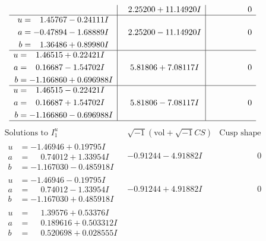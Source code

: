 \documentclass[1p]{elsarticle_modified}
\theoremstyle{definition}
\newcommand{\I}{\sqrt{-1}}
\begin{document}
$$\begin{array}{c|c|c}
 & \phantom{-}2.25200 + 11.14920 I & \phantom{-0.000000 } 0 \\ \hline\begin{aligned}
u &= \phantom{-}1.45767 - 0.24111 I \\
a &= -0.47894 - 1.68889 I \\
b &= \phantom{-}1.36486 + 0.89980 I\end{aligned}
 & \phantom{-}2.25200 - 11.14920 I & \phantom{-0.000000 } 0 \\ \hline\begin{aligned}
u &= \phantom{-}1.46515 + 0.22421 I \\
a &= \phantom{-}0.16687 - 1.54702 I \\
b &= -1.166860 + 0.696988 I\end{aligned}
 & \phantom{-}5.81806 + 7.08117 I & \phantom{-0.000000 } 0 \\ \hline\begin{aligned}
u &= \phantom{-}1.46515 - 0.22421 I \\
a &= \phantom{-}0.16687 + 1.54702 I \\
b &= -1.166860 - 0.696988 I\end{aligned}
 & \phantom{-}5.81806 - 7.08117 I & \phantom{-0.000000 } 0\\
 \hline 
 \end{array}$$\newpage$$\begin{array}{c|c|c}  
\text{Solutions to }I^u_{1}& \I (\text{vol} + \sqrt{-1}CS) & \text{Cusp shape}\\
 \hline 
\begin{aligned}
u &= -1.46946 + 0.19795 I \\
a &= \phantom{-}0.74012 + 1.33954 I \\
b &= -1.167030 - 0.485918 I\end{aligned}
 & -0.91244 - 4.91882 I & \phantom{-0.000000 } 0 \\ \hline\begin{aligned}
u &= -1.46946 - 0.19795 I \\
a &= \phantom{-}0.74012 - 1.33954 I \\
b &= -1.167030 + 0.485918 I\end{aligned}
 & -0.91244 + 4.91882 I & \phantom{-0.000000 } 0 \\ \hline\begin{aligned}
u &= \phantom{-}1.39576 + 0.53376 I \\
a &= \phantom{-}0.189616 + 0.503312 I \\
b &= \phantom{-}0.520698 + 0.028555 I\end{aligned}

\end{array}$$
\end{document}
